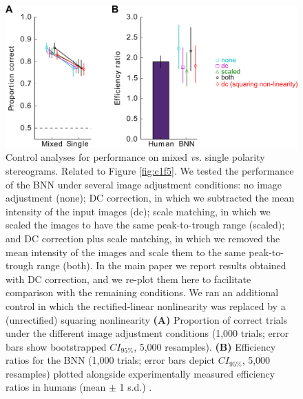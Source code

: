 \begin{figure}[!h]
  \centering
  \includegraphics{FigS4.png}
  \caption[Controls for performance on mixed and single polarity stimuli.]{Control analyses for performance on mixed \textit{vs.} single polarity stereograms. Related to Figure \ref{fig:c1f5}. We tested the performance of the BNN under several image adjustment conditions: no image adjustment (none); DC correction, in which we subtracted the mean intensity of the input images (dc); scale matching, in which we scaled the images to have the same peak-to-trough range (scaled); and DC correction plus scale matching, in which we removed the mean intensity of the images and scale them to the same peak-to-trough range (both). In the main paper we report results obtained with DC correction, and we re-plot them here to facilitate comparison with the remaining conditions. We ran an additional control in which the rectified-linear nonlinearity was replaced by a (unrectified) squaring nonlinearity \textbf{(A)} Proportion of correct trials under the different image adjustment conditions (1,000 trials; error bars show bootstrapped $CI_{95\%}$, 5,000 resamples). \textbf{(B)} Efficiency ratios for the BNN (1,000 trials; error bars depict $CI_{95\%}$, 5,000 resamples) plotted alongside experimentally measured efficiency ratios in humans (mean $\pm$ 1 s.d.) \cite{Harris:1995va}.} 
  \label{fig:c1fs4}
\end{figure}

